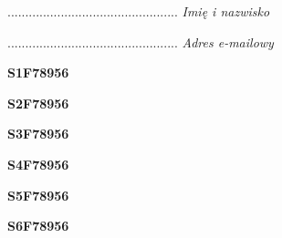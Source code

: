\begin{turn}{90}\begin{minipage}{\linewidth} \vspace{20mm} ................................................  \textit{Imię i nazwisko}\end{minipage}\end{turn}

\begin{turn}{90}\begin{minipage}{\linewidth} \vspace{20mm} ................................................  \textit{Adres e-mailowy}\end{minipage}\end{turn}

\begin{turn}{90}\huge \begin{minipage}{\linewidth} \vspace{10mm}\textbf{S1F78956}\end{minipage}\end{turn}

\begin{turn}{90}\huge \begin{minipage}{\linewidth} \vspace{10mm}\textbf{S2F78956}\end{minipage}\end{turn}

\begin{turn}{90}\huge \begin{minipage}{\linewidth} \vspace{10mm}\textbf{S3F78956}\end{minipage}\end{turn}

\begin{turn}{90}\huge \begin{minipage}{\linewidth} \vspace{10mm}\textbf{S4F78956}\end{minipage}\end{turn}

\begin{turn}{90}\huge \begin{minipage}{\linewidth} \vspace{10mm}\textbf{S5F78956}\end{minipage}\end{turn}

\begin{turn}{90}\huge \begin{minipage}{\linewidth} \vspace{10mm}\textbf{S6F78956}\end{minipage}\end{turn}

